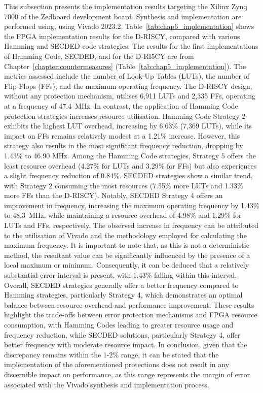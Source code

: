 This subsection presents the implementation results targeting the Xilinx Zynq 7000 of the Zedboard development board. Synthesis and implementation are performed using, using Vivado 2023.2.
Table~\ref{tab:chap6_implementation} shows the FPGA implementation results for the D-RISCY, compared with various Hamming and SECDED code strategies. The results for the first implementations of Hamming Code, SECDED, and for the D-RI5CY are from Chapter~\ref{chapter:countermeasures} (Table~\ref{tab:chap5_implementation}). The metrics assessed include the number of Look-Up Tables (LUTs), the number of Flip-Flops (FFs), and the maximum operating frequency. The D-RISCY design, without any protection mechanism, utilises 6,911 LUTs and 2,335 FFs, operating at a frequency of \SI{47.4}{\mega\hertz}. In contrast, the application of Hamming Code protection strategies increases resource utilisation. Hamming Code Strategy 2 exhibits the highest LUT overhead, increasing by 6.63\% (7,369 LUTs), while its impact on FFs remains relatively modest at a 1.21\% increase. However, this strategy also results in the most significant frequency reduction, dropping by 1.43\% to 46.90 MHz. Among the Hamming Code strategies, Strategy 5 offers the least resource overhead (4.27\% for LUTs and 3.29\% for FFs) but also experiences a slight frequency reduction of 0.84\%.
SECDED strategies show a similar trend, with Strategy 2 consuming the most resources (7.55\% more LUTs and 1.33\% more FFs than the D-RISCY). Notably, SECDED Strategy 4 offers an improvement in frequency, increasing the maximum operating frequency by 1.43\% to \SI{48.3}{\mega\hertz}, while maintaining a resource overhead of 4.98\% and 1.29\% for LUTs and FFs, respectively. The observed increase in frequency can be attributed to the utilisation of Vivado and the methodology employed for calculating the maximum frequency. It is important to note that, as this is not a deterministic method, the resultant value can be significantly influenced by the presence of a local maximum or minimum. Consequently, it can be deduced that a relatively substantial error interval is present, with 1.43\% falling within this interval.
Overall, SECDED strategies generally offer a better frequency compared to Hamming strategies, particularly Strategy 4, which demonstrates an optimal balance between resource overhead and performance improvement. These results highlight the trade-offs between error protection mechanisms and FPGA resource consumption, with Hamming Codes leading to greater resource usage and frequency reduction, while SECDED solutions, particularly Strategy 4, offer better frequency with moderate resource impact. In conclusion, given that the discrepancy remains within the 1-2\% range, it can be stated that the implementation of the aforementioned protections does not result in any discernible impact on performance, as this range represents the margin of error associated with the Vivado synthesis and implementation process.

